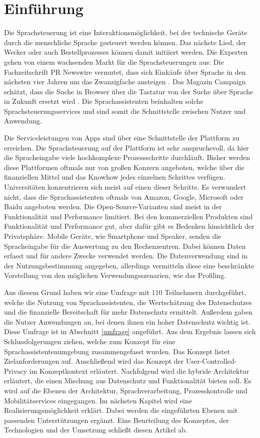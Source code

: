 \section{Einführung}
Die Sprachsteuerung ist eine Interaktionsmöglichkeit, bei der technische Geräte durch die menschliche Sprache gesteuert werden können. Das nächste Lied, der Wecker oder auch Bestellprozesses können damit initiiert werden.  Die Experten gehen von einem wachsenden Markt für die Sprachsteuerungen aus: Die Fachzeitschrift \glqq PR Newswire\grqq{} vermutet, dass sich Einkäufe über Sprache in den nächsten vier Jahren um das Zwanzigfache ansteigen \cite{prNewswire}. Das Magazin \glqq Campaign\grqq{} schätzt, dass die Suche in Browser über die Tastatur von der Suche über Sprache in Zukunft ersetzt wird \cite{Campaign}. Die Sprachassistenten beinhalten solche Sprachsteuerungsservices und sind somit die Schnittstelle zwischen Nutzer und Anwendung. \newline

Die Serviceleistungen von Apps sind über eine Schnittstelle der Plattform zu erreichen. Die Sprachsteuerung auf der Plattform ist sehr anspruchsvoll, da hier die Spracheingabe viele hochkomplexe Prozessschritte durchläuft. Bisher werden diese Plattformen oftmals nur von großen Konzern angeboten, welche über die finanziellen Mittel und das Knowhow jedes einzelnen Schrittes verfügen. Universitäten konzentrieren sich meist auf einen dieser Schritte. Es verwundert nicht, dass die Sprachassistenten oftmals von Amazon, Google, Microsoft oder Baidu angeboten werden. Die Open-Source-Varianten sind meist in der Funktionalität und Performance limitiert. Bei den kommerziellen Produkten sind Funktionalität und Performance gut, aber dafür gibt es Bedenken hinsichtlich der Privatsphäre. Mobile Geräte, wie Smartphone und Speaker, senden die Spracheingabe für die Auswertung zu den Rechenzentren. Dabei können Daten erfasst und für andere Zwecke verwendet werden. Die Datenverwendung sind in der Nutzungsbestimmung angegeben, allerdings vermitteln diese eine beschränkte Vorstellung von den möglichen Verwendungsszenarien, wie das Profiling.  \newline

Aus diesem Grund haben wir eine Umfrage mit 110 Teilnehmern durchgeführt, welche die Nutzung von Sprachassistenten, die Wertschätzung des Datenschutzes und die finanzielle Bereitschaft für mehr Datenschutz ermittelt. Außerdem gaben die Nutzer Anwendungen an, bei denen ihnen ein hoher Datenschutz wichtig ist. Diese Umfrage ist in Abschnitt \ref{umfrage} angeführt. Aus dem Ergebnis lassen sich Schlussfolgerungen ziehen, welche zum Konzept für eine Sprachassistentenumgebung zusammengefasst wurden. Das Konzept listet Zielanforderungen auf. Anschließend wird das Konzept der User-Controlled-Privacy im Konzeptkontext erläutert.
Nachfolgend wird die hybride Architektur erläutert, die einen Mischung aus Datenschutz und Funktionalität bieten soll. Es wird auf die Ebenen der Architektur, Sprachverarbeitung, Prozesskontrolle und Mobilitätservices eingegangen.
Im nächsten Kapitel wird eine Realisierungsmöglichkeit erklärt. Dabei werden die eingeführten Ebenen mit passenden Unterstützungen ergänzt. 
Eine Beurteilung des Konzeptes, der Technologien und der Umsetzung schließt diesen Artikel ab.
